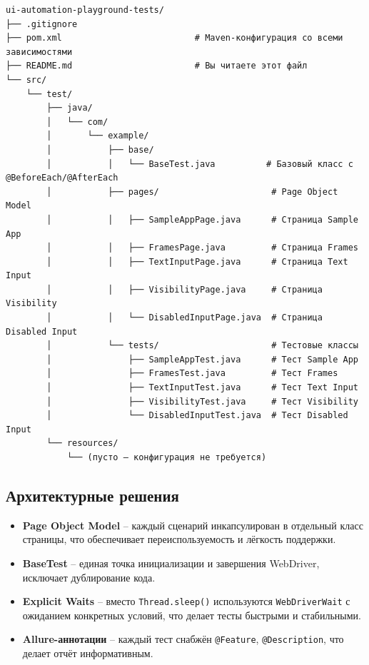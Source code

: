 \documentclass[12pt,a4paper]{article}
\begin{document}
\begin{lstlisting}
ui-automation-playground-tests/
├── .gitignore
├── pom.xml                          # Maven-конфигурация со всеми зависимостями
├── README.md                        # Вы читаете этот файл
└── src/
    └── test/
        ├── java/
        │   └── com/
        │       └── example/
        │           ├── base/
        │           │   └── BaseTest.java          # Базовый класс с @BeforeEach/@AfterEach
        │           ├── pages/                      # Page Object Model
        │           │   ├── SampleAppPage.java      # Страница Sample App
        │           │   ├── FramesPage.java         # Страница Frames
        │           │   ├── TextInputPage.java      # Страница Text Input
        │           │   ├── VisibilityPage.java     # Страница Visibility
        │           │   └── DisabledInputPage.java  # Страница Disabled Input
        │           └── tests/                      # Тестовые классы
        │               ├── SampleAppTest.java      # Тест Sample App
        │               ├── FramesTest.java         # Тест Frames
        │               ├── TextInputTest.java      # Тест Text Input
        │               ├── VisibilityTest.java     # Тест Visibility
        │               └── DisabledInputTest.java  # Тест Disabled Input
        └── resources/
            └── (пусто — конфигурация не требуется)
\end{lstlisting}

\subsection*{Архитектурные решения}
\begin{itemize}
\item \textbf{Page Object Model} -- каждый сценарий инкапсулирован в отдельный класс страницы, что обеспечивает переиспользуемость и лёгкость поддержки.
\item \textbf{BaseTest} -- единая точка инициализации и завершения WebDriver, исключает дублирование кода.
\item \textbf{Explicit Waits} -- вместо \texttt{Thread.sleep()} используются \texttt{WebDriverWait} с ожиданием конкретных условий, что делает тесты быстрыми и стабильными.
\item \textbf{Allure-аннотации} -- каждый тест снабжён \texttt{@Feature}, \texttt{@Description}, что делает отчёт информативным.
\end{itemize}
\end{document}
